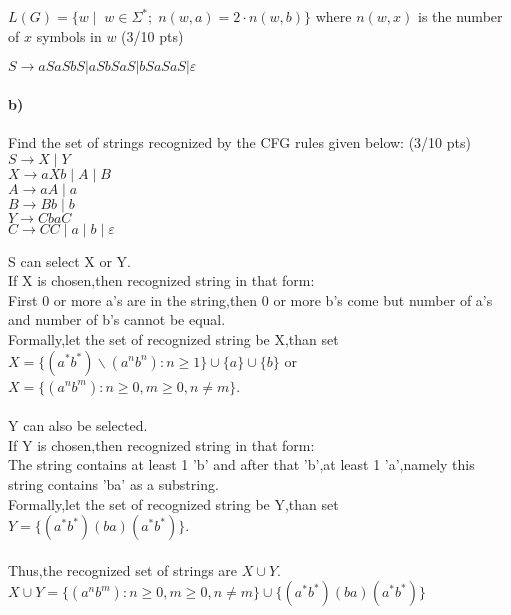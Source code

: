 \documentclass[a4paper,12pt]{article}
\begin{document}
$L(G)=\{w \mid \;  w \in \Sigma^*;\; n(w,a)=2\cdot n(w,b)\}$ where $n(w,x)$ is the number of $x$ symbols in $w$ \hfill \small{(3/10 pts)} \\

\begin{tcolorbox}

$S \to aSaSbS|aSbSaS|bSaSaS|\varepsilon$\\

\end{tcolorbox}



\paragraph{b)} Find the set of strings recognized by the CFG rules given below:         \hfill \small{(3/10 pts)} \\


$S \to X \mid Y$ \\
$X \to aXb \mid A \mid B$ \\
$A \to aA \mid a$ \\
$B \to Bb \mid b$ \\
$Y \to CbaC$ \\
$C \to CC \mid a \mid b \mid \varepsilon$  \\

\begin{tcolorbox}
S can select X or Y.\\
If X is chosen,then recognized string in that form:\\
First 0 or more a's are in the string,then 0 or more b's come but number of a's and number of b's cannot be equal.\\
Formally,let the set of recognized string be X,than set $X=\{(a^*b^*) \backslash (a^nb^n):n\geq 1\} \cup \{a\} \cup \{b\}$ or $X=\{(a^nb^m):n\geq 0,m\geq 0, n \neq m \}$.\\\\
Y can also be selected.\\
If Y is chosen,then recognized string in that form:\\
The string contains at least 1 'b' and after that 'b',at least 1 'a',namely this string contains 'ba' as a substring.\\
Formally,let the set of recognized string be Y,than set $Y=\{(a^*b^*)(ba) (a^*b^*)\}$.\\\\
Thus,the recognized set of strings are $X\cup Y$.\\
$X\cup Y=\{(a^nb^m):n\geq 0,m\geq 0, n \neq m \} \cup \{(a^*b^*)(ba) (a^*b^*)\}$ 

\end{tcolorbox}
\end{document}
